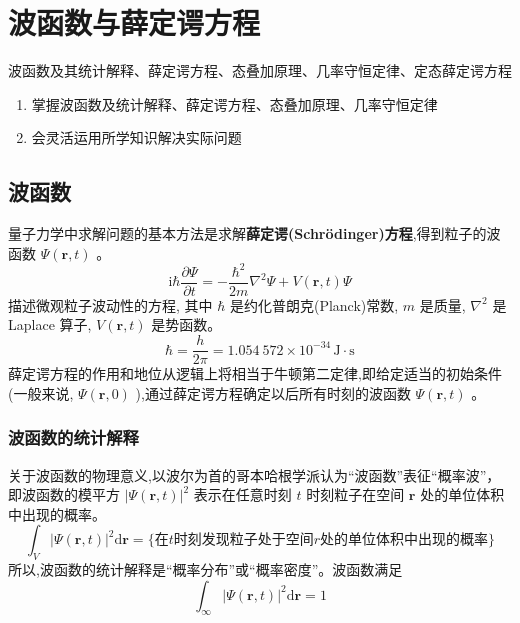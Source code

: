 \documentclass[12pt, a4paper, oneside, UTF8]{ctexbook}
\begin{document}
% 
\else
\fi

\chapter{波函数与薛定谔方程}
\begin{examct}{}{}
    波函数及其统计解释、薛定谔方程、态叠加原理、几率守恒定律、定态薛定谔方程
\end{examct}
\begin{examrqm}{}{}
    \begin{enumerate}
        \item 掌握波函数及统计解释、薛定谔方程、态叠加原理、几率守恒定律 
        \item 会灵活运用所学知识解决实际问题
    \end{enumerate}
\end{examrqm}


\section{波函数}

量子力学中求解问题的基本方法是求解\textbf{薛定谔(Schrödinger)方程},得到粒子的波函数 $\Psi(\mathbf{r},t)$ 。
\begin{equation}
    \boxed{\mathrm{i}\hbar\frac{\partial\Psi}{\partial t} = -\frac{\hbar^2}{2m}\nabla^2\Psi + V(\mathbf{r},t)\Psi}
\end{equation}
描述微观粒子波动性的方程, 其中 $\hbar$ 是约化普朗克(Planck)常数, $m$ 是质量, $\nabla^2$ 是 Laplace 算子, $V(\mathbf{r},t)$ 是势函数。
\begin{equation}
    \hbar=\frac{h}{2\pi}=1.054\ 572\times 10^{-34}\,\mathrm{J}\cdot\mathrm{s}
\end{equation}
薛定谔方程的作用和地位从逻辑上将相当于牛顿第二定律,即给定适当的初始条件(一般来说, $\Psi(\mathbf{r},0)$ ),通过薛定谔方程确定以后所有时刻的波函数 $\Psi(\mathbf{r},t)$ 。
\subsection{波函数的统计解释}
关于波函数的物理意义,以波尔为首的哥本哈根学派认为“波函数”表征“概率波”，即波函数的模平方 $\left|\Psi(\mathbf{r},t)\right|^2$ 表示在任意时刻 $t$ 时刻粒子在空间 $\mathbf{r}$ 处的单位体积中出现的概率。
\begin{equation}
    \int_{V}\left|\Psi(\mathbf{r},t)\right|^2\mathrm{d}\mathbf{r} = \{\text{在}t\text{时刻发现粒子处于空间}r\text{处的单位体积中出现的概率}\}
\end{equation}
所以,波函数的统计解释是“概率分布”或“概率密度”。波函数满足
\begin{equation}
    \int_{\infty}\left|\Psi(\mathbf{r},t)\right|^2\mathrm{d}\mathbf{r} = 1
\end{equation}
\end{document}

